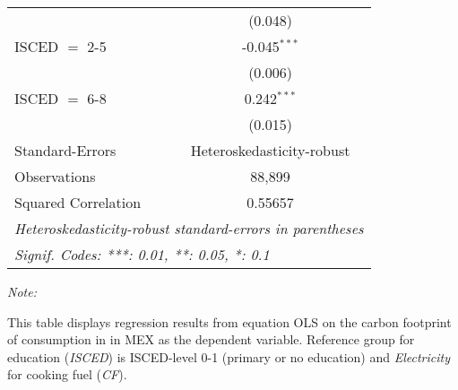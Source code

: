 \begin{table}[htbp!]
\begin{adjustbox}{width = 1\textwidth, max height = 0.95\textheight, center}
\begin{threeparttable}[b]
\begin{tabular}{lc}
                                & (0.048)\\   
            ISCED $=$ 2-5       & -0.045$^{***}$\\   
                                & (0.006)\\   
            ISCED $=$ 6-8       & 0.242$^{***}$\\   
                                & (0.015)\\   
            \midrule 
            Standard-Errors     & Heteroskedasticity-robust \\   
            Observations        & 88,899\\  
            Squared Correlation & 0.55657\\  
            \midrule \midrule
            \multicolumn{2}{l}{\emph{Heteroskedasticity-robust standard-errors in parentheses}}\\
            \multicolumn{2}{l}{\emph{Signif. Codes: ***: 0.01, **: 0.05, *: 0.1}}\\
         \end{tabular}
         
         \begin{tablenotes}\item \medskip \textit{Note:}
            \item This table displays regression results from equation OLS on the carbon footprint of consumption in  in MEX as the dependent variable.  Reference group for education (\textit{ISCED}) is ISCED-level 0-1 (primary or no education) and \textit{Electricity} for cooking fuel (\textit{CF}).
         \end{tablenotes}
      \end{threeparttable}
   \end{adjustbox}
\end{table}


